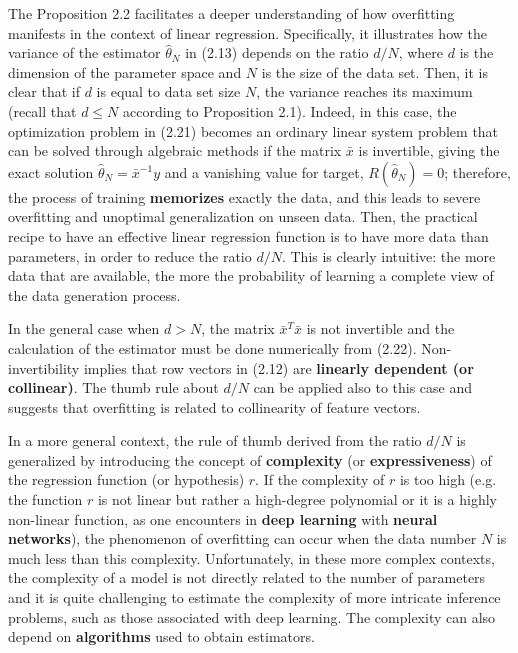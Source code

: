 \documentclass{report}
\begin{document}
The Proposition 2.2 facilitates a deeper understanding of how overfitting manifests in the context of linear regression. Specifically, it illustrates how the variance of the estimator $\hat{\theta}_N$ in (2.13) depends on the ratio $d/N$, where $d$ is the dimension of the parameter space and $N$ is the size of the data set. Then, it is clear that if $d$ is equal to data set size $N$, the variance reaches its maximum (recall that $d \leq N$ according to Proposition 2.1). Indeed, in this case, the optimization problem in (2.21) becomes an ordinary linear system problem that can be solved through algebraic methods if the matrix $\bar{x}$ is invertible, giving the exact solution $\hat{\theta}_N = \bar{x}^{-1}y$ and a vanishing value for target, $R(\hat{\theta}_N) = 0$; therefore, the process of training \textbf{memorizes} exactly the data, and this leads to severe overfitting and unoptimal generalization on unseen data. Then, the practical recipe to have an effective linear regression function is to have more data than parameters, in order to reduce the ratio $d/N$. This is clearly intuitive: the more data that are available, the more the probability of learning a complete view of the data generation process.

In the general case when $d > N$, the matrix $\bar{x}^T\bar{x}$ is not invertible and the calculation of the estimator must be done numerically from (2.22). Non-invertibility implies that row vectors in (2.12) are \textbf{linearly dependent (or collinear)}. The thumb rule about $d/N$ can be applied also to this case and suggests that overfitting is related to collinearity of feature vectors.

In a more general context, the rule of thumb derived from the ratio $d/N$ is generalized by introducing the concept of \textbf{complexity} (or \textbf{expressiveness}) of the regression function (or hypothesis) $r$. If the complexity of $r$ is too high (e.g. the function $r$ is not linear but rather a high-degree polynomial or it is a highly non-linear function, as one encounters in \textbf{deep learning} with \textbf{neural networks}), the phenomenon of overfitting can occur when the data number $N$ is much less than this complexity. Unfortunately, in these more complex contexts, the complexity of a model is not directly related to the number of parameters and it is quite challenging to estimate the complexity of more intricate inference problems, such as those associated with deep learning. The complexity can also depend on \textbf{algorithms} used to obtain estimators.
\end{document}
